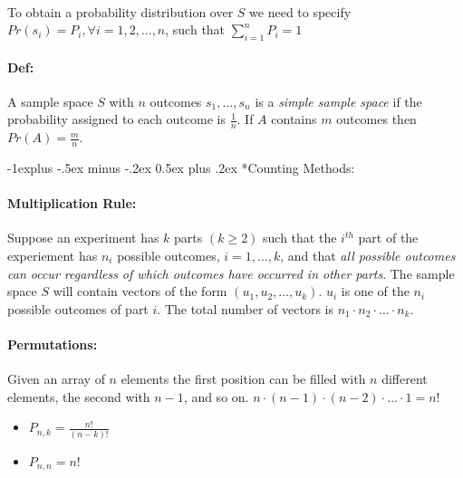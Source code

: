 \documentclass[landscape,10pt]{article}
\makeatletter
\renewcommand{\subsection}{\@startsection{subsection}{2}{0mm}%
                                {-1explus -.5ex minus -.2ex}%
                                {0.5ex plus .2ex}%
                                {\normalfont\normalsize\bfseries}}
\makeatother
\begin{document}
\begin{multicols}{3}
        \paragraph*{} 
            To obtain a probability distribution over $S$ we need to specify \(Pr(s_i) = P_i, \forall i = 1, 2, \dots, n\), such that \(\sum\limits_{i=1}^{n}P_i = 1\)

        \paragraph*{Def: } 
            A sample space $S$ with $n$ outcomes $s_1, \ldots, s_n$ is a \textit{simple sample space} if the probability assigned to each outcome is $\frac{1}{n}$. If $A$ contains $m$ outcomes then \(Pr(A) = \frac{m}{n}\).

    \subsection*{Counting Methods: }
        
        \paragraph*{Multiplication Rule: } 
            Suppose an experiment has $k$ parts \((k \geq 2)\) such that the $i^{th}$ part of the experiement has $n_i$ possible outcomes, $i = 1, \ldots, k$, and that \textit{all possible outcomes can occur regardless of which outcomes have occurred in other parts}. The sample space $S$ will contain vectors of the form $(u_1, u_2, \ldots, u_k)$. $u_i$ is one of the $n_i$ possible outcomes of part $i$. The total number of vectors is $n_1 \cdot n_2 \cdot \ldots \cdot n_k$.
        
        \paragraph*{Permutations: } 
            Given an array of $n$ elements the first position can be filled with $n$ different elements, the second with $n-1$, and so on. $n \cdot (n-1) \cdot (n-2) \cdot \ldots \cdot 1 = n!$

            \begin{itemize}
                \item[] \(P_{n,k} = \frac{n!}{(n-k)!}\)
                \item[] \(P_{n,n} = n!\)
            \end{itemize}


\end{multicols}
\end{document}
